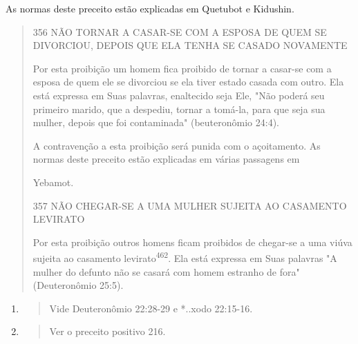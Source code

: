 As normas deste preceito estão explicadas em Quetubot e Kidushin.

\begin{quote}
356 NÃO TORNAR A CASAR-SE COM A ESPOSA DE QUEM SE DIVORCIOU, DEPOIS QUE
ELA TENHA SE CASADO NOVAMENTE

Por esta proibição um homem fica proibido de tornar a casar-se com a
esposa de quem ele se divorciou se ela tiver estado casada com outro.
Ela está expressa em Suas palavras, enaltecido seja Ele, "Não poderá seu
primeiro marido, que a despediu, tornar a tomá-la, para que seja sua
mulher, depois que foi contaminada" (beuteronômio 24:4).

A contravenção a esta proibição será punida com o açoitamento. As normas
deste preceito estão explicadas em várias passagens em

Yebamot.

357 NÃO CHEGAR-SE A UMA MULHER SUJEITA AO CASAMENTO LEVIRATO

Por esta proibição outros homens ficam proibidos de chegar-se a uma
viúva sujeita ao casamento levirato\textsuperscript{462}. Ela está
expressa em Suas palavras "A mulher do defunto não se casará com homem
estranho de fora" (Deuteronô­mio 25:5).
\end{quote}

\begin{enumerate}
\def\labelenumi{\arabic{enumi}.}
\setcounter{enumi}{460}
\item
  \begin{quote}
  Vide Deuteronômio 22:28-29 e *..xodo 22:15-16.
  \end{quote}
\item
  \begin{quote}
  Ver o preceito positivo 216.
  \end{quote}
\end{enumerate}

